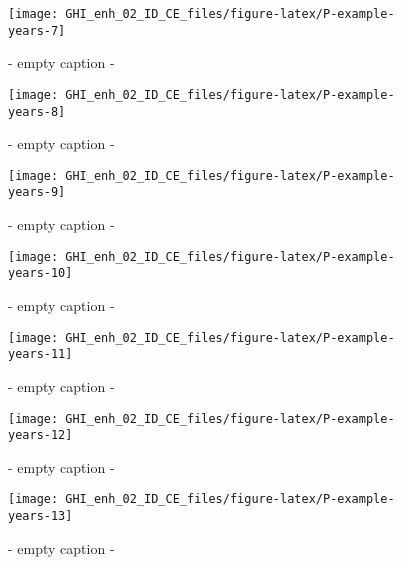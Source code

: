 \documentclass[
  10pt,
  a4paper,oneside]{article}
\begin{document}
\begin{figure}[H]

{\centering \texttt{[image: GHI\_enh\_02\_ID\_CE\_files/figure-latex/P-example-years-7]} 

}

\caption{ - empty caption - }\label{fig:P-example-years-7}
\end{figure}
\begin{figure}[H]

{\centering \texttt{[image: GHI\_enh\_02\_ID\_CE\_files/figure-latex/P-example-years-8]} 

}

\caption{ - empty caption - }\label{fig:P-example-years-8}
\end{figure}
\begin{figure}[H]

{\centering \texttt{[image: GHI\_enh\_02\_ID\_CE\_files/figure-latex/P-example-years-9]} 

}

\caption{ - empty caption - }\label{fig:P-example-years-9}
\end{figure}
\begin{figure}[H]

{\centering \texttt{[image: GHI\_enh\_02\_ID\_CE\_files/figure-latex/P-example-years-10]} 

}

\caption{ - empty caption - }\label{fig:P-example-years-10}
\end{figure}
\begin{figure}[H]

{\centering \texttt{[image: GHI\_enh\_02\_ID\_CE\_files/figure-latex/P-example-years-11]} 

}

\caption{ - empty caption - }\label{fig:P-example-years-11}
\end{figure}
\begin{figure}[H]

{\centering \texttt{[image: GHI\_enh\_02\_ID\_CE\_files/figure-latex/P-example-years-12]} 

}

\caption{ - empty caption - }\label{fig:P-example-years-12}
\end{figure}
\begin{figure}[H]

{\centering \texttt{[image: GHI\_enh\_02\_ID\_CE\_files/figure-latex/P-example-years-13]} 

}

\caption{ - empty caption - }\label{fig:P-example-years-13}
\end{figure}
\end{document}
